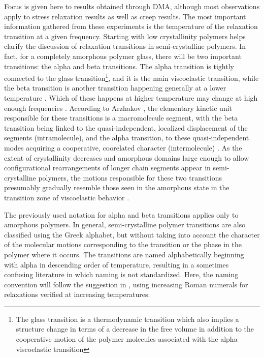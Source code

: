 Focus is given here to results obtained through DMA, although most observations apply to stress relaxation results as well as creep results.
The most important information gathered from these experiments is the temperature of the relaxation transition at a given frequency.
Starting with low crystallinity polymers helps clarify the discussion of relaxation transitions in semi-crystalline polymers.
In fact, for a completely amorphous polymer glass, there will be two important transitions: the alpha and beta transitions.
The alpha transition is tightly connected to the glass transition\footnote{The glass transition is a thermodynamic transition which also implies a structure change in terms of a decrease in the free volume in addition to the cooperative motion of the polymer molecules associated with the alpha viscoelastic transition}, and it is the main viscoelastic transition, while the beta transition is another transition happening generally at a lower temperature \citep{arzhakovRelaxationPhysicalMechanical2019}.
Which of these happens at higher temperature may change at high enough frequencies \citep{matsuokaThermodynamicTheoryViscoelasticity1996}.
According to Arzhakov \citep{arzhakovRelaxationPhysicalMechanical2019}, the elementary kinetic unit responsible for these transitions is a macromolecule segment, with the beta transition being linked to the quasi-independent, localized displacement of the segments (intramolecule), and the alpha transition, to these quasi-independent modes acquiring a cooperative, coorelated character (intermolecule) \citep{bershteinGeneralMechanismTransition1985, matsuokaThermodynamicTheoryViscoelasticity1996}.
As the extent of crystallinity decreases and amorphous domains large enough to allow configurational rearrangements of longer chain segments appear in semi-crystalline polymers, the motions responsible for these two transitions presumably gradually resemble those seen in the amorphous state in the transition zone of viscoelastic behavior \citep{ferryViscoelasticPropertiesPolymers1980}.

The previously used notation for alpha and beta transitions applies only to amorphous polymers.
In general, semi-crystalline polymer transitions are also classified using the Greek alphabet, but without taking into account the character of the molecular motions corresponding to the transition or the phase in the polymer where it occurs.
The transitions are named alphabetically beginning with alpha in descending order of temperature, resulting in a sometimes confusing literature in which naming is not standardized.
Here, the naming convention will follow the suggestion in \cite{arzhakovRelaxationPhysicalMechanical2019}, using increasing Roman numerals for relaxations verified at increasing temperatures.

